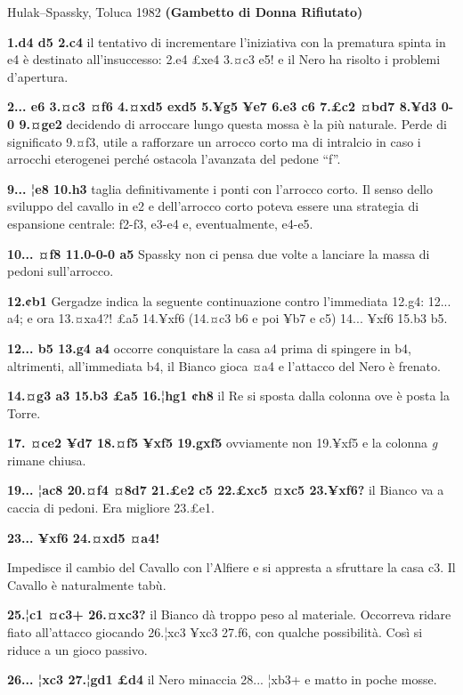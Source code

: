 Hulak--Spassky, Toluca 1982 \textbf{(Gambetto di Donna Rifiutato)}

\textbf{1.d4 d5 2.c4} il tentativo di incrementare l'iniziativa con la
prematura spinta in e4 è destinato all'insuccesso: 2.e4 £xe4 3.¤c3 e5! e
il Nero ha risolto i problemi d'apertura.

\textbf{2... e6 3.¤c3 ¤f6 4.¤xd5 exd5 5.¥g5 ¥e7 6.e3 c6 7.£c2 ¤bd7 8.¥d3
0-0 9.¤ge2} decidendo di arroccare lungo questa mossa è la più naturale.
Perde di significato 9.¤f3, utile a rafforzare un arrocco corto ma di
intralcio in caso i arrocchi eterogenei perché ostacola l'avanzata del
pedone ``f''.

\textbf{9... ¦e8 10.h3} taglia definitivamente i ponti con l'arrocco
corto. Il senso dello sviluppo del cavallo in e2 e dell'arrocco corto
poteva essere una strategia di espansione centrale: f2-f3, e3-e4 e,
eventualmente, e4-e5.

\textbf{10... ¤f8 11.0-0-0 a5} Spassky non ci pensa due volte a lanciare
la massa di pedoni sull'arrocco.

\textbf{12.¢b1} Gergadze indica la seguente continuazione contro
l'immediata 12.g4: 12... a4; e ora 13.¤xa4?! £a5 14.¥xf6 (14.¤c3 b6 e
poi ¥b7 e c5) 14... ¥xf6 15.b3 b5.

\textbf{12... b5 13.g4 a4} occorre conquistare la casa a4 prima di
spingere in b4, altrimenti, all'immediata b4, il Bianco gioca ¤a4 e
l'attacco del Nero è frenato.

\textbf{14.¤g3 a3 15.b3 £a5 16.¦hg1 ¢h8} il Re si sposta dalla colonna
ove è posta la Torre.


\textbf{17. ¤ce2 ¥d7 18.¤f5 ¥xf5 19.gxf5} ovviamente non 19.¥xf5 e la
colonna \emph{g} rimane chiusa.

\textbf{19... ¦ac8 20.¤f4 ¤8d7 21.£e2 c5 22.£xc5 ¤xc5 23.¥xf6?} il
Bianco va a caccia di pedoni. Era migliore 23.£e1.

\textbf{23... ¥xf6 24.¤xd5 ¤a4!}

Impedisce il cambio del Cavallo con l'Alfiere e si appresta a sfruttare
la casa c3. Il Cavallo è naturalmente tabù.

\textbf{25.¦c1 ¤c3+ 26.¤xc3?} il Bianco dà troppo peso al materiale.
Occorreva ridare fiato all'attacco giocando 26.¦xc3 ¥xc3 27.f6, con
qualche possibilità. Così si riduce a un gioco passivo.

\textbf{26... ¦xc3 27.¦gd1 £d4} il Nero minaccia 28... ¦xb3+ e matto in
poche mosse.


